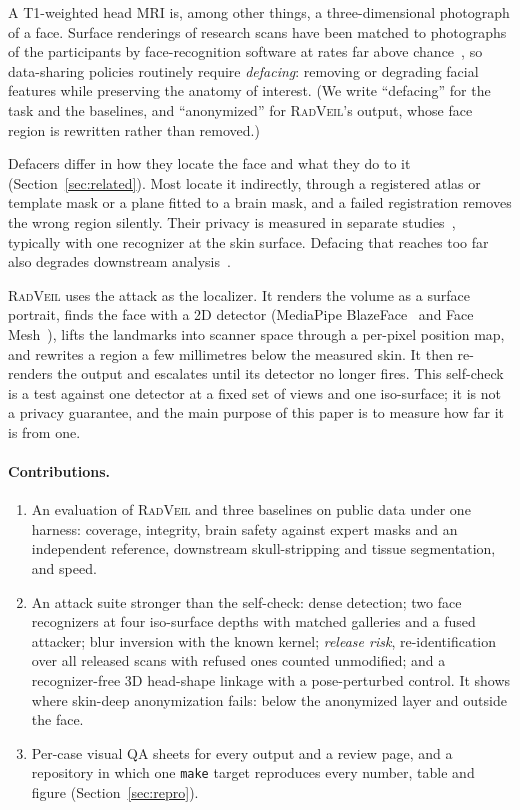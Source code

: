 \documentclass[11pt]{article}
\newcommand{\rv}{\textsc{RadVeil}}
\newcommand{\code}[1]{\texttt{#1}}
\begin{document}
A T1-weighted head MRI is, among other things, a three-dimensional
photograph of a face. Surface renderings of research scans have been
matched to photographs of the participants by face-recognition software at
rates far above chance~\cite{prior2009,mazura2012,schwarz2019}, so
data-sharing policies routinely require \emph{defacing}: removing or
degrading facial features while preserving the anatomy of interest.
(We write ``defacing'' for the task and the baselines, and ``anonymized''
for \rv{}'s output, whose face region is rewritten rather than removed.)

Defacers differ in how they locate the face and what they do to it
(Section~\ref{sec:related}). Most locate it indirectly, through a registered
atlas or template mask or a plane fitted to a brain mask, and a failed
registration removes the wrong region silently. Their privacy is measured
in separate studies~\cite{schwarz2021,theyers2021}, typically with one
recognizer at the skin surface. Defacing that reaches too far also degrades
downstream analysis~\cite{desitter2020}.

\rv{} uses the attack as the localizer. It renders the volume as a surface
portrait, finds the face with a 2D detector (MediaPipe
BlazeFace~\cite{bazarevsky2019} and Face Mesh~\cite{kartynnik2019}), lifts the
landmarks into scanner space through a per-pixel position map, and rewrites
a region a few millimetres below the measured skin. It then re-renders the
output and escalates until its detector no longer fires. This self-check is
a test against one detector at a fixed set of views and one iso-surface; it
is not a privacy guarantee, and the main purpose of this paper is to measure
how far it is from one.

\paragraph{Contributions.}
\begin{enumerate}
\item An evaluation of \rv{} and three baselines on public data under one
  harness: coverage, integrity, brain safety against expert masks and an
  independent reference, downstream skull-stripping and tissue
  segmentation, and speed.
\item An attack suite stronger than the self-check: dense detection; two
  face recognizers at four iso-surface depths with matched galleries and a
  fused attacker; blur inversion with the known kernel; \emph{release risk},
  re-identification over all released scans with refused ones counted
  unmodified; and a recognizer-free 3D head-shape linkage with a
  pose-perturbed control. It shows where skin-deep anonymization fails:
  below the anonymized layer and outside the face.
\item Per-case visual QA sheets for every output and a review page, and a
  repository in which one \code{make} target reproduces every number,
  table and figure (Section~\ref{sec:repro}).
\end{enumerate}
\end{document}
